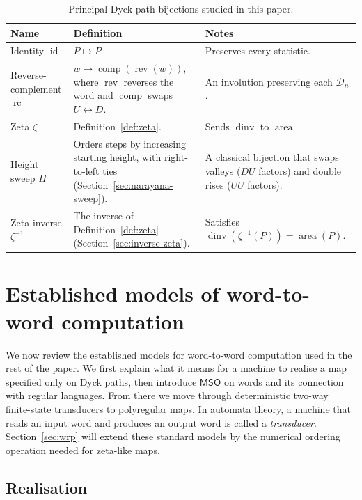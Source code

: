 \documentclass[11pt]{article}
\theoremstyle{definition}
\newcommand{\D}{\mathcal D}
\newcommand{\MSO}{\mathsf{MSO}}
\newcommand{\area}{\operatorname{area}}
\newcommand{\dinv}{\operatorname{dinv}}
\newcommand{\id}{\operatorname{id}}
\newcommand{\rc}{\operatorname{rc}}
\newcommand{\rev}{\operatorname{rev}}
\newcommand{\comp}{\operatorname{comp}}
\begin{document}
\begin{table}
\centering
\small
\renewcommand{\arraystretch}{1.25}
\begin{tabularx}{\textwidth}{@{}>{\raggedright\arraybackslash}p{}
                                   >{\raggedright\arraybackslash}X
                                   >{\raggedright\arraybackslash}X@{}}
\toprule
Name & Definition & Notes \\
\midrule
Identity $\id$ & $P\mapsto P$ & Preserves every statistic. \\
Reverse-complement $\rc$ &
  $w\mapsto \comp(\rev(w))$, where $\rev$ reverses the word and
  $\comp$ swaps $U\leftrightarrow D$. &
  An involution preserving each $\D_n$. \\
Zeta $\zeta$ & Definition~\ref{def:zeta}. &
  Sends $\dinv$ to $\area$. \\
Height sweep $H$ &
  Orders steps by increasing starting height, with right-to-left ties
  (Section~\ref{sec:narayana-sweep}). &
  A classical bijection that swaps valleys ($DU$ factors) and double rises
  ($UU$ factors). \\
Zeta inverse $\zeta^{-1}$ &
  The inverse of Definition~\ref{def:zeta}
  (Section~\ref{sec:inverse-zeta}). &
  Satisfies $\dinv(\zeta^{-1}(P))=\area(P)$. \\
\bottomrule
\end{tabularx}
\caption{Principal Dyck-path bijections studied in this paper.}
\label{tab:named-bijections}
\end{table}

\section{Established models of word-to-word computation}\label{sec:models}

We now review the established models for word-to-word computation used in the
rest of the paper.  We first explain what it means for a machine to realise a
map specified only on Dyck paths, then introduce $\MSO$ on words and its
connection with regular languages.  From there we move through deterministic
two-way finite-state transducers to polyregular maps.  In automata theory, a
machine that reads an input word and produces an output word is called a
\emph{transducer}.  Section~\ref{sec:wrp} will extend these standard models by
the numerical ordering operation needed for zeta-like maps.

\subsection{Realisation}
\end{document}
